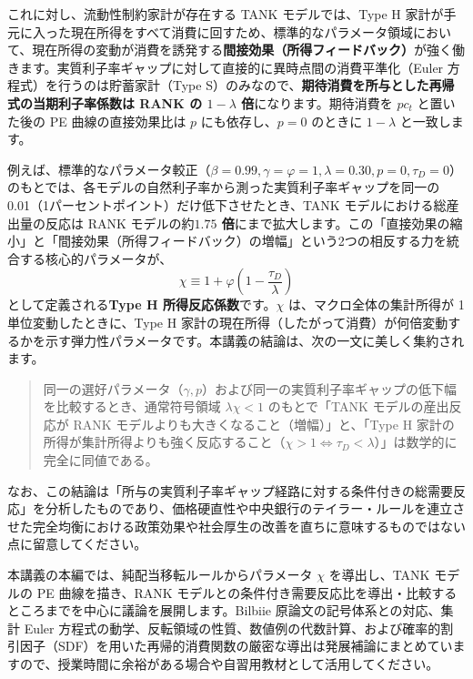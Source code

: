 \documentclass[
  japanese,
  lualatex,
  ja=standard,
  12pt,
  a4paper]{ltjsarticle}
\begin{document}
これに対し、流動性制約家計が存在する TANK モデルでは、Type H
家計が手元に入った現在所得をすべて消費に回すため、標準的なパラメータ領域において、現在所得の変動が消費を誘発する\textbf{間接効果（所得フィードバック）}が強く働きます。実質利子率ギャップに対して直接的に異時点間の消費平準化（Euler
方程式）を行うのは貯蓄家計（Type
S）のみなので、\textbf{期待消費を所与とした再帰式の当期利子率係数は RANK
の \(1-\lambda\) 倍}になります。期待消費を \(p c_t\) と置いた後の PE
曲線の直接効果比は \(p\) にも依存し、\(p=0\) のときに \(1-\lambda\)
と一致します。


例えば、標準的なパラメータ較正（\(\beta=0.99, \gamma=\varphi=1, \lambda=0.30, p=0, \tau_D=0\)）のもとでは、各モデルの自然利子率から測った実質利子率ギャップを同一の
0.01（1パーセントポイント）だけ低下させたとき、TANK
モデルにおける総産出量の反応は RANK モデルの約\textbf{\(1.75\)
倍}にまで拡大します。この「直接効果の縮小」と「間接効果（所得フィードバック）の増幅」という2つの相反する力を統合する核心的パラメータが、
\[
\chi \equiv 1 + \varphi\left( 1 - \frac{\tau_D}{\lambda} \right)
\] として定義される\textbf{Type H 所得反応係数}です。\(\chi\)
は、マクロ全体の集計所得が 1 単位変動したときに、Type H
家計の現在所得（したがって消費）が何倍変動するかを示す弾力性パラメータです。本講義の結論は、次の一文に美しく集約されます。

\begin{quote}
同一の選好パラメータ（\(\gamma, p\)）および同一の実質利子率ギャップの低下幅を比較するとき、通常符号領域
\(\lambda\chi<1\) のもとで「TANK モデルの産出反応が RANK
モデルよりも大きくなること（増幅）」と、「Type H
家計の所得が集計所得よりも強く反応すること（\(\chi>1 \iff \tau_D < \lambda\)）」は数学的に完全に同値である。
\end{quote}

なお、この結論は「所与の実質利子率ギャップ経路に対する条件付きの総需要反応」を分析したものであり、価格硬直性や中央銀行のテイラー・ルールを連立させた完全均衡における政策効果や社会厚生の改善を直ちに意味するものではない点に留意してください。

本講義の本編では、純配当移転ルールからパラメータ \(\chi\) を導出し、TANK
モデルの PE 曲線を描き、RANK
モデルとの条件付き需要反応比を導出・比較するところまでを中心に議論を展開します。Bilbiie
原論文の記号体系との対応、集計 Euler
方程式の動学、反転領域の性質、数値例の代数計算、および確率的割引因子（SDF）を用いた再帰的消費関数の厳密な導出は発展補論にまとめていますので、授業時間に余裕がある場合や自習用教材として活用してください。
\end{document}
